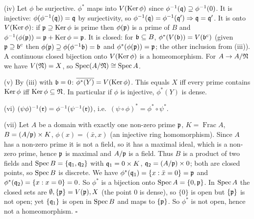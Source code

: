 \documentclass[11pt]{article}
\begin{document}
(iv) Let $\phi$ be surjective. $\phi^*$ maps into $V(\operatorname{Ker}\phi)$ since $\phi^{-1}(\mathfrak q)\supseteq\phi^{-1}(0)$. It is injective: $\phi(\phi^{-1}(\mathfrak q))=\mathfrak q$ by surjectivity, so $\phi^{-1}(\mathfrak q)=\phi^{-1}(\mathfrak q')\Rightarrow\mathfrak q=\mathfrak q'$. It is onto $V(\operatorname{Ker}\phi)$: if $\mathfrak p\supseteq\operatorname{Ker}\phi$ is prime then $\phi(\mathfrak p)$ is a prime of $B$ and $\phi^{-1}(\phi(\mathfrak p))=\mathfrak p+\operatorname{Ker}\phi=\mathfrak p$. It is closed: for $\mathfrak b\subseteq B$, $\phi^*(V(\mathfrak b))=V(\mathfrak b^{\mathrm{c}})$ (given $\mathfrak p\supseteq\mathfrak b^{\mathrm{c}}$ then $\phi(\mathfrak p)\supseteq\phi(\phi^{-1}\mathfrak b)=\mathfrak b$ and $\phi^*(\phi(\mathfrak p))=\mathfrak p$; the other inclusion from (iii)). A continuous closed bijection onto $V(\operatorname{Ker}\phi)$ is a homeomorphism. For $A\to A/\mathfrak N$ we have $V(\mathfrak N)=X$, so $\operatorname{Spec}(A/\mathfrak N)\cong\operatorname{Spec} A$.

(v) By (iii) with $\mathfrak b=0$: $\overline{\phi^*(Y)}=V(\operatorname{Ker}\phi)$. This equals $X$ iff every prime contains $\operatorname{Ker}\phi$ iff $\operatorname{Ker}\phi\subseteq\mathfrak N$. In particular if $\phi$ is injective, $\phi^*(Y)$ is dense.

(vi) $(\psi\phi)^{-1}(\mathfrak r)=\phi^{-1}(\psi^{-1}(\mathfrak r))$, i.e.\ $(\psi\circ\phi)^*=\phi^*\circ\psi^*$.

(vii) Let $A$ be a domain with exactly one non-zero prime $\mathfrak p$, $K=\operatorname{Frac}A$, $B=(A/\mathfrak p)\times K$, $\phi(x)=(\bar x,x)$ (an injective ring homomorphism). Since $A$ has a non-zero prime it is not a field, so it has a maximal ideal, which is a non-zero prime, hence $\mathfrak p$ is maximal and $A/\mathfrak p$ is a field. Thus $B$ is a product of two fields and $\operatorname{Spec} B=\{\mathfrak q_1,\mathfrak q_2\}$ with $\mathfrak q_1=0\times K$, $\mathfrak q_2=(A/\mathfrak p)\times0$; both are closed points, so $\operatorname{Spec} B$ is discrete. We have $\phi^*(\mathfrak q_1)=\{x:\bar x=0\}=\mathfrak p$ and $\phi^*(\mathfrak q_2)=\{x:x=0\}=0$. So $\phi^*$ is a bijection onto $\operatorname{Spec} A=\{0,\mathfrak p\}$. In $\operatorname{Spec} A$ the closed sets are $\emptyset,\{\mathfrak p\}=V(\mathfrak p),X$ (the point $0$ is dense), so $\{0\}$ is open but $\{\mathfrak p\}$ is not open; yet $\{\mathfrak q_1\}$ is open in $\operatorname{Spec} B$ and maps to $\{\mathfrak p\}$. So $\phi^*$ is not open, hence not a homeomorphism. \hfill$\square$
\end{document}

